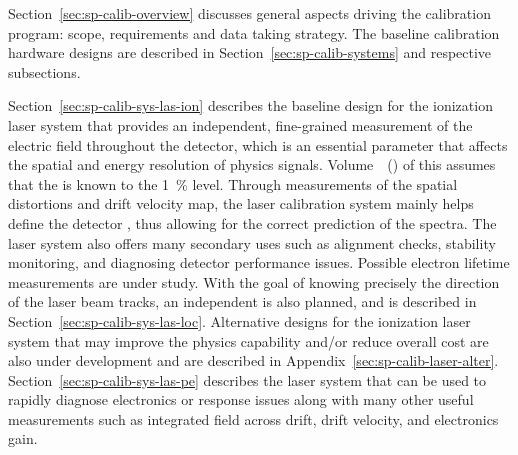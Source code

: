 Section~\ref{sec:sp-calib-overview} discusses general aspects driving the calibration program: scope, requirements and data taking strategy.
The baseline calibration hardware designs are described in Section~\ref{sec:sp-calib-systems} and respective subsections. 

Section~\ref{sec:sp-calib-sys-las-ion} describes the baseline design for the ionization laser system that provides an independent, fine-grained measurement of the electric field throughout the detector, which is an essential parameter that affects the spatial and energy resolution of physics signals. 
Volume~\volnumberphysics~(\voltitlephysics) of this 
assumes that the  is known to the \SI{1}{\%} level. Through measurements of the spatial distortions and drift velocity map, the laser calibration system mainly helps define the detector , thus allowing for the correct prediction of the  spectra. The laser system also offers many secondary uses such as alignment checks, stability monitoring, and diagnosing detector performance issues. 
Possible electron lifetime measurements are under study. 
With the goal of knowing precisely the direction of the laser beam tracks, an independent 
is also planned, and is described in Section~\ref{sec:sp-calib-sys-las-loc}.
Alternative designs for the ionization laser system that may improve the physics capability and/or reduce overall cost are also under development and are described in Appendix~\ref{sec:sp-calib-laser-alter}. %
Section~\ref{sec:sp-calib-sys-las-pe} describes the \phel laser system that can be used to rapidly diagnose electronics or  response issues along with many other useful measurements such as integrated field across drift, drift velocity, and electronics gain. 

